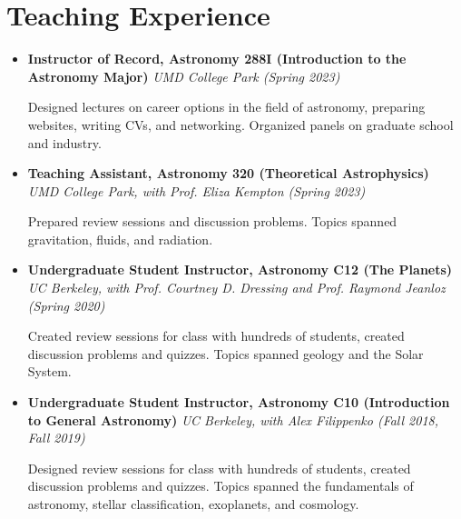\documentclass[letterpaper,10.5pt]{article}
\newcommand{\resumeItem}[2]{
  \item\small{
    \textbf{#1}{#2 \vspace{-2pt}}
  }
}
\newcommand{\resumeSubHeadingListEnd}{\end{itemize}}
\newcommand{\resumeItemListStart}{\begin{itemize}}
\newcommand{\shorterSection}[1]{\vspace{-10pt}\section{#1}}
\begin{document}
\shorterSection{Teaching Experience}
\resumeItemListStart
\resumeItem{Instructor of Record, Astronomy 288I (Introduction to the Astronomy Major)}{ \textit{UMD College Park (Spring 2023)}}
    
    Designed lectures on career options in the field of astronomy, preparing websites, writing CVs, and networking. Organized panels on graduate school and industry. 
\resumeItem{Teaching Assistant, Astronomy 320 (Theoretical Astrophysics)}{ \textit{UMD College Park, with Prof. Eliza Kempton (Spring 2023)}}

Prepared review sessions and discussion problems. Topics spanned gravitation, fluids, and radiation.
\resumeItem{Undergraduate Student Instructor, Astronomy C12 (The Planets)}{ \textit{UC Berkeley, with Prof. Courtney D. Dressing and Prof. Raymond Jeanloz (Spring 2020)}}

Created review sessions for class with hundreds of students, created discussion problems and quizzes. Topics spanned geology and the Solar System.
\resumeItem{Undergraduate Student Instructor, Astronomy C10 (Introduction to General Astronomy)}{\textit{ UC Berkeley, with Alex Filippenko (Fall 2018, Fall 2019)}}

Designed review sessions for class with hundreds of students, created discussion problems and quizzes. Topics spanned the fundamentals of astronomy, stellar classification, exoplanets, and cosmology.
\resumeSubHeadingListEnd
\end{document}
